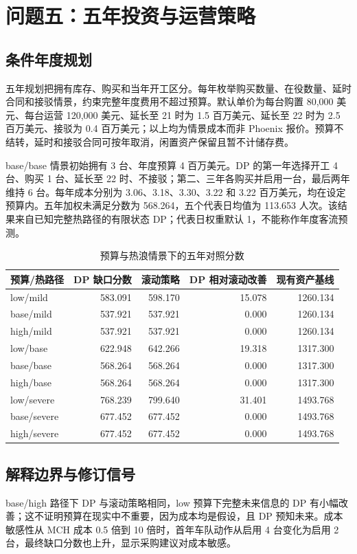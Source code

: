 \documentclass[12pt]{article}
\begin{document}
\section{问题五：五年投资与运营策略}

\subsection{条件年度规划}
五年规划把拥有库存、购买和当年开工区分。每年枚举购买数量、在役数量、延时合同和接驳情景，约束完整年度费用不超过预算。默认单价为每台购置 80,000 美元、每台运营 120,000 美元、延长至 21 时为 1.5 百万美元、延长至 22 时为 2.5 百万美元、接驳为 0.4 百万美元；以上均为情景成本而非 Phoenix 报价。预算不结转，延时和接驳合同可按年取消，闲置资产保留且暂不计储存费。

base/base 情景初始拥有 3 台、年度预算 4 百万美元。DP 的第一年选择开工 4 台、购买 1 台、延长至 22 时、不接驳；第二、三年各购买并启用一台，最后两年维持 6 台。每年成本分别为 3.06、3.18、3.30、3.22 和 3.22 百万美元，均在设定预算内。五年加权未满足分数为 568.264，五个代表日均值为 113.653 人次。该结果来自已知完整热路径的有限状态 DP；代表日权重默认 1，不能称作年度客流预测。

\begin{table}[H]
\centering
\caption{预算与热浪情景下的五年对照分数}
\label{tab:q5}
\small
\begin{tabular}{lrrrr}
\toprule
预算/热路径 & DP 缺口分数 & 滚动策略 & DP 相对滚动改善 & 现有资产基线 \\
\midrule
low/mild & 583.091 & 598.170 & 15.078 & 1260.134 \\
base/mild & 537.921 & 537.921 & 0.000 & 1260.134 \\
high/mild & 537.921 & 537.921 & 0.000 & 1260.134 \\
low/base & 622.948 & 642.266 & 19.318 & 1317.300 \\
base/base & 568.264 & 568.264 & 0.000 & 1317.300 \\
high/base & 568.264 & 568.264 & 0.000 & 1317.300 \\
low/severe & 768.239 & 799.640 & 31.401 & 1493.768 \\
base/severe & 677.452 & 677.452 & 0.000 & 1493.768 \\
high/severe & 677.452 & 677.452 & 0.000 & 1493.768 \\
\bottomrule
\end{tabular}
\end{table}

\subsection{解释边界与修订信号}
base/high 路径下 DP 与滚动策略相同，low 预算下完整未来信息的 DP 有小幅改善；这不证明预算在现实中不重要，因为成本均是假设，且 DP 预知未来。成本敏感性从 MCH 成本 0.5 倍到 10 倍时，首年车队动作从启用 4 台变化为启用 2 台，最终缺口分数也上升，显示采购建议对成本敏感。
\end{document}
